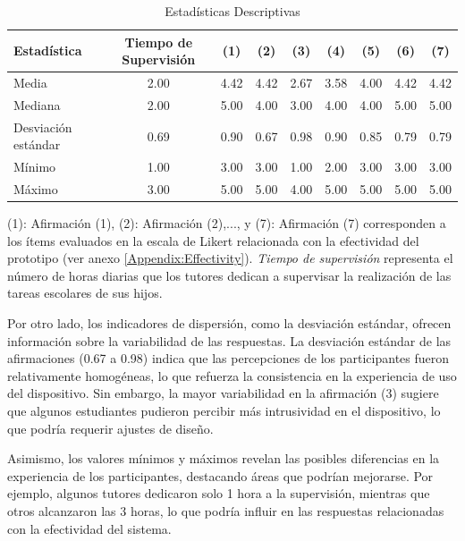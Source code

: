\documentclass[a4paper,fleqn]{cas-sc}
\begin{document}
				\begin{table}[h!]
				\centering
				\caption{Estadísticas Descriptivas}
				\begin{tabularx}{0.85\textwidth}{Xcccccccc}
					\toprule
					\textbf{Estadística} & \textbf{Tiempo de Supervisión} & \textbf{(1)} & \textbf{(2)} & \textbf{(3)} & \textbf{(4)} & \textbf{(5)} & \textbf{(6)} & \textbf{(7)} \\
					\midrule
					Media & 2.00 & 4.42 & 4.42 & 2.67 & 3.58 & 4.00 & 4.42 & 4.42 \\
					Mediana & 2.00 & 5.00 & 4.00 & 3.00 & 4.00 & 4.00 & 5.00 & 5.00 \\
					Desviación estándar & 0.69 & 0.90 & 0.67 & 0.98 & 0.90 & 0.85 & 0.79 & 0.79 \\
					Mínimo & 1.00 & 3.00 & 3.00 & 1.00 & 2.00 & 3.00 & 3.00 & 3.00 \\
					Máximo & 3.00 & 5.00 & 5.00 & 4.00 & 5.00 & 5.00 & 5.00 & 5.00 \\
					\bottomrule
				\end{tabularx}
				\label{table:DescriptiveStatistics}
				\vspace{0.3em} %
				\parbox{0.85\textwidth}{\footnotesize
					(1): Afirmación (1), (2): Afirmación (2),..., y (7): Afirmación (7) corresponden a los ítems evaluados en la escala de Likert relacionada con la efectividad del prototipo (ver anexo \ref{Appendix:Effectivity}). \textit{Tiempo de supervisión} representa el número de horas diarias que los tutores dedican a supervisar la realización de las tareas escolares de sus hijos.
				}
				\end{table}
				
				Por otro lado, los indicadores de dispersión, como la desviación estándar, ofrecen información sobre la variabilidad de las respuestas. La desviación estándar de las afirmaciones (0.67 a 0.98) indica que las percepciones de los participantes fueron relativamente homogéneas, lo que refuerza la consistencia en la experiencia de uso del dispositivo. Sin embargo, la mayor variabilidad en la afirmación (3) sugiere que algunos estudiantes pudieron percibir más intrusividad en el dispositivo, lo que podría requerir ajustes de diseño.
				
				Asimismo, los valores mínimos y máximos revelan las posibles diferencias en la experiencia de los participantes, destacando áreas que podrían mejorarse. Por ejemplo, algunos tutores dedicaron solo 1 hora a la supervisión, mientras que otros alcanzaron las 3 horas, lo que podría influir en las respuestas relacionadas con la efectividad del sistema.
				
\end{document}
